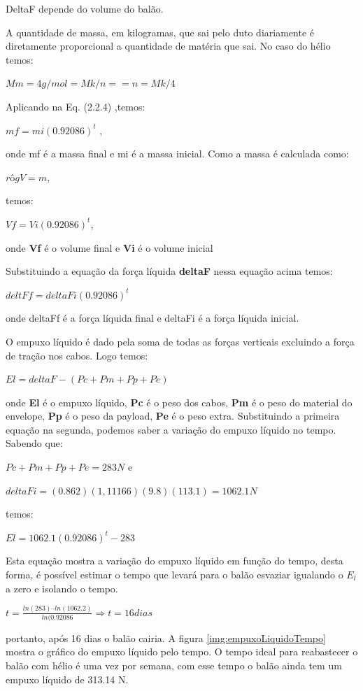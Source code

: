 	DeltaF depende do volume do balão.

	 A quantidade de massa, em kilogramas, que sai pelo duto diariamente é diretamente proporcional a quantidade de matéria que sai. No caso do hélio temos:

		 $Mm = 4g/mol = Mk/n   == n = Mk/4$

	Aplicando na Eq. (2.2.4) ,temos:

	$mf = mi (0.92086)^t$ ,

	 onde mf é a massa final e mi é a massa inicial.
	Como a massa é calculada como:

	$rô g V = m$,

	temos:

	$Vf = Vi (0.92086)^t$,

	 onde \textbf{Vf} é o volume final e \textbf{Vi} é o volume inicial

	Substituindo a equação da força líquida \textbf{deltaF} nessa equação acima temos:


	$deltFf = deltaFi(0.92086)^t$

	onde deltaFf é a força líquida final e deltaFi é a força líquida inicial.

	 O empuxo líquido é dado pela soma de todas as forças verticais excluindo a força de tração nos cabos. Logo temos:

	$El = deltaF - (Pc + Pm + Pp+Pe)$

	onde \textbf{El} é o empuxo líquido, \textbf{Pc} é o peso dos cabos, \textbf{Pm} é o peso do material do envelope, \textbf{Pp} é o peso da payload, \textbf{Pe} é o peso extra.
	Substituindo a primeira equação na segunda, podemos saber a variação do empuxo líquido no tempo. Sabendo que:

	 $Pc + Pm + Pp+Pe = 283 N$   e

	 $deltaFi = (0.862)(1,11166)(9.8)(113.1) = 1062.1 N$

	temos:

	 $El = 1062.1(0.92086)^t - 283$

	Esta equação mostra a variação do empuxo líquido em função do tempo, desta forma, é possível estimar o tempo que levará para o balão esvaziar igualando o $E_l$ a zero e isolando o tempo.

	$t = \frac{ln(283) – ln(1062.2)}{ln(0.92086} \Rightarrow t = 16 dias$

	portanto, após 16 dias o balão cairia. A figura \ref{img:empuxoLiquidoTempo} mostra o gráfico do empuxo líquido pelo tempo. O tempo ideal para reabastecer o balão com hélio é uma vez por semana, com esse tempo o balão ainda tem um empuxo líquido de 313.14 N.

